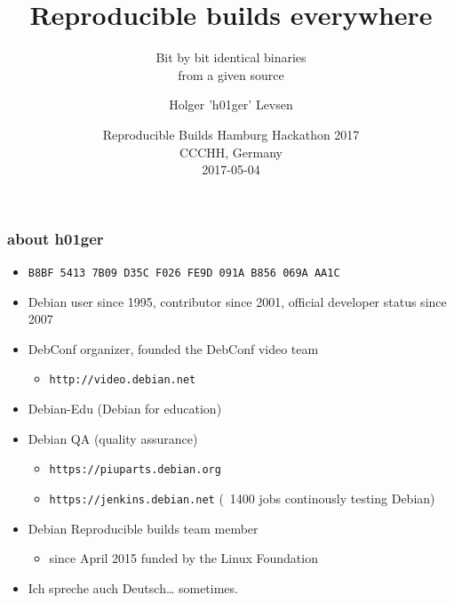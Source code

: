 \documentclass[14pt,aspectratio=169]{beamer}
\title[Reproducible Builds everywhere]{Reproducible
builds everywhere}
\subtitle{Bit by bit identical binaries \\
from a given source}
\author[h01ger]{%
   \texorpdfstring{
            \centering
            Holger 'h01ger' Levsen
   }{h01ger}}
\date[CCCHH 2017]{%
 Reproducible Builds Hamburg Hackathon 2017\\
CCCHH, Germany\\
 \small{2017-05-04}}
\newif\ifplacelogo
\begin{document}
\placelogofalse

\begin{frame}[plain]
 \titlepage
\end{frame}

\placelogotrue

\begin{frame}
 \frametitle{about h01ger}

 \begin{itemize}
  \item \small{\texttt{B8BF 5413 7B09 D35C F026  FE9D 091A B856 069A AA1C}}
  \item Debian user since 1995, contributor since 2001, official developer
  status since 2007
  \item DebConf organizer,
  founded the DebConf video team
   \begin{itemize}
    \item \texttt{http://video.debian.net}
   \end{itemize}
 \item Debian-Edu (Debian for education)
  \item Debian QA (quality assurance)
  \begin{itemize}
   \item \texttt{https://piuparts.debian.org}
   \item \texttt{https://jenkins.debian.net} (~1400 jobs continously testing Debian)
  \end{itemize}
  \item Debian Reproducible builds team member
  \begin{itemize}
   \item since April 2015 funded by the Linux Foundation
 \end{itemize}
  \item<2> Ich spreche auch Deutsch… sometimes.
 \end{itemize}
\end{frame}
\end{document}
